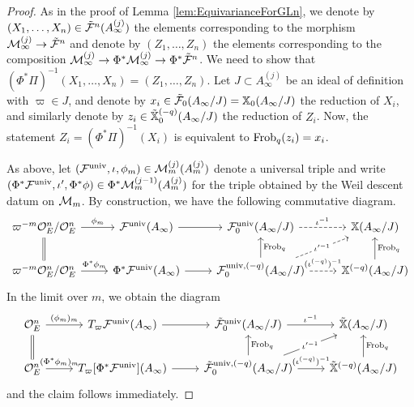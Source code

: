 \documentclass[../main.tex]{subfiles}
\begin{document}
\begin{proof}
    As in the proof of Lemma \ref{lem:EquivarianceForGLn}, we denote by $(X_1, \dots, X_n) \in \tilde {\mathcal{F}}^n(A_\infty^{(j)})$
    the elements corresponding to the morphism
    $\mathcal{M}_\infty^{(j)} \to \tilde {\mathcal{F}}^n$ and denote by 
    $(Z_1, \dots, Z_n)$ the elements corresponding to the composition
    $\mathcal{M}_\infty^{(j)} \to \Phi^*\mathcal{M}_\infty^{(j)} \to \Phi^*\tilde {\mathcal{F}}^n$.
    We need to show that $(\Phi^* \Pi)^{-1}(X_1, \dots, X_n) = (Z_1, \dots, Z_n)$.
    Let $J \subset A_\infty^{(j)}$ be an ideal of definition with 
    $\varpi \in J$, and denote by $x_i \in \tilde {\mathcal{F}}_0(A_\infty/J) = \mathbb{X}_0(A_\infty/J)$ the reduction 
    of $X_i$, and similarly denote by $z_i \in \tilde {\mathbb{X}}^{(-q)}_0(A_\infty/J)$ the reduction 
    of $Z_i$. Now, the statement $Z_i = (\Phi^* \Pi)^{-1}(X_i)$ is equivalent to $\mathrm{Frob}_q(z_i) = x_i$.

     As above, let $(\mathcal{F}^{\mathrm{univ}}, \iota, \phi_m) \in \mathcal{M}_m^{(j)}(A_m^{(j)})$ denote a universal
     triple and write 
     $(\Phi^*\mathcal{F}^{\mathrm{univ}}, \iota', \Phi^* \phi) \in \Phi^* \mathcal{M}_m^{(j-1)}(A_m^{(j)})$ for the 
     triple obtained by the Weil descent datum on $\mathcal{M}_m$. By construction, we have the following commutative diagram.
\begin{equation*}
\begin{tikzcd}[ampersand replacement=\&]
	{\varpi^{-m}\cO_E^n/\cO_E^n} \& {\cF^\univ(A_\infty)} \& { \cF^\univ_0(A_\infty/J)} \& {\XX(A_\infty/J)} \\
	{\varpi^{-m}\cO_E^n/\cO_E^n} \& {\Phi^*\cF^\univ(A_\infty)} \& { \cF^{\univ,{(-q)}}_0(A_\infty/J)} \& { \XX^{(-q)}(A_\infty/J)}
	\arrow["{\phi_m}", from=1-1, to=1-2]
	\arrow[Rightarrow, no head, from=1-1, to=2-1]
	\arrow[from=1-2, to=1-3]
	\arrow["{\iota^{-1}}", dashed, from=1-3, to=1-4]
	\arrow["{\Phi^*\phi_m}", from=2-1, to=2-2]
	\arrow[from=2-2, to=2-3]
	\arrow["{\Frob_q}"', from=2-3, to=1-3]
	\arrow["{\iota'^{-1}}"{description}, dashed, from=2-3, to=1-4]
	\arrow["{(\iota^{(-q)})^{-1}}", dashed, from=2-3, to=2-4]
	\arrow["{\Frob_q}"', from=2-4, to=1-4]
\end{tikzcd}
\end{equation*}
    In the limit over $m$, we obtain the diagram
    \begin{equation*}
\begin{tikzcd}[ampersand replacement=\&]
	{\cO_E^n} \& {T_\varpi\cF^\univ(A_\infty)} \& {\tilde \cF^\univ_0(A_\infty/J)} \& {\tilde \XX(A_\infty/J)} \\
	{\cO_E^n} \& {T_\varpi[\Phi^*\cF^\univ](A_\infty)} \& {\tilde \cF^{\univ,{(-q)}}_0(A_\infty/J)} \& {\tilde \XX^{(-q)}(A_\infty/J)}
	\arrow["{(\phi_m)_m}", from=1-1, to=1-2]
	\arrow[Rightarrow, no head, from=1-1, to=2-1]
	\arrow[from=1-2, to=1-3]
	\arrow["{\iota^{-1}}", from=1-3, to=1-4]
	\arrow["{(\Phi^*\phi_m)_m}", from=2-1, to=2-2]
	\arrow[from=2-2, to=2-3]
	\arrow["{\Frob_q}"', from=2-3, to=1-3]
	\arrow["{\iota'^{-1}}"{description}, from=2-3, to=1-4]
	\arrow["{(\iota^{(-q)})^{-1}}", from=2-3, to=2-4]
	\arrow["{\Frob_q}"', from=2-4, to=1-4]
\end{tikzcd}
    \end{equation*}
    and the claim follows immediately.
\end{proof}
\end{document}
